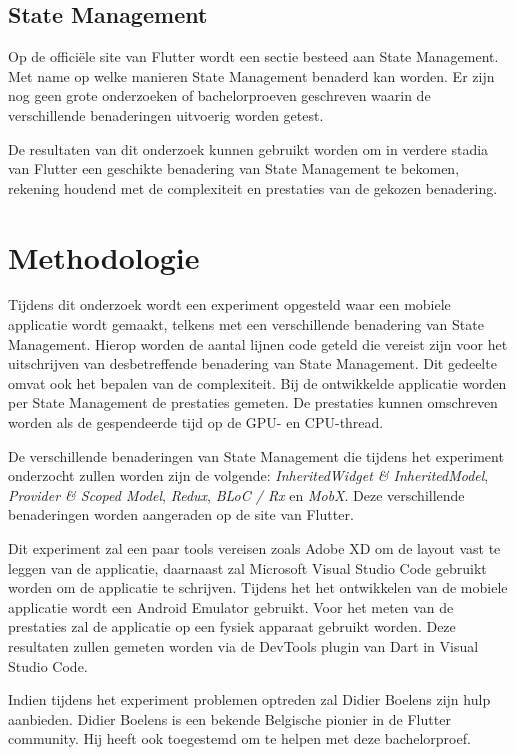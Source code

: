 
\subsection*{State Management}
Op de officiële site van Flutter wordt een sectie besteed aan State Management.
Met name op welke manieren State Management benaderd kan worden. Er zijn nog geen grote
onderzoeken of bachelorproeven geschreven waarin de verschillende benaderingen uitvoerig worden getest.

De resultaten van dit onderzoek kunnen gebruikt worden om in verdere stadia van Flutter
een geschikte benadering van State Management te bekomen, rekening houdend met de complexiteit en prestaties
van de gekozen benadering.


\section{Methodologie}
\label{sec:methodologie}
Tijdens dit onderzoek wordt een experiment opgesteld waar een mobiele applicatie wordt gemaakt, telkens met een verschillende benadering van State Management. 
Hierop worden de aantal lijnen code geteld die vereist zijn voor het uitschrijven van
desbetreffende benadering van State Management.
Dit gedeelte omvat ook het bepalen van de complexiteit.
Bij de ontwikkelde applicatie worden per State Management de prestaties gemeten.
De prestaties kunnen omschreven worden als de gespendeerde tijd op de GPU- en CPU-thread.

De verschillende benaderingen van State Management die tijdens het experiment onderzocht zullen worden zijn de volgende: \emph{InheritedWidget \& InheritedModel}, 
\emph{Provider \& Scoped Model}, \emph{Redux}, \emph{BLoC / Rx} en \emph{MobX}.
Deze verschillende benaderingen worden aangeraden op de site van Flutter.

Dit experiment zal een paar tools vereisen zoals Adobe XD om de layout vast te leggen van de applicatie,
daarnaast zal Microsoft Visual Studio Code gebruikt worden om de applicatie te schrijven.
Tijdens het het ontwikkelen van de mobiele applicatie wordt een Android Emulator gebruikt. Voor het meten van de prestaties zal de applicatie op een fysiek apparaat gebruikt worden. Deze resultaten zullen gemeten worden via de DevTools plugin van Dart in Visual Studio Code.

Indien tijdens het experiment problemen optreden zal Didier Boelens zijn hulp aanbieden.
Didier Boelens is een bekende Belgische pionier in de Flutter community. Hij heeft ook toegestemd om te helpen met deze bachelorproef.

